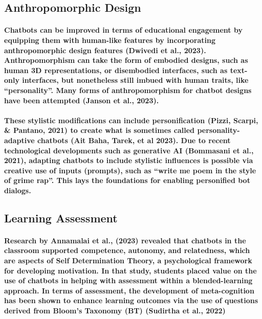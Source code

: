 \documentclass{article}
\begin{document}
\subsection*{Anthropomorphic Design}

\paragraph{Chatbots can be improved in terms of educational engagement by equipping them with human-like features by incorporating anthropomorphic design features (Dwivedi et al., 2023). Anthropomorphism can take the form of embodied designs, such as human 3D representations, or disembodied interfaces, such as text-only interfaces, but nonetheless still imbued with human traits, like “personality”. Many forms of anthropomorphism for chatbot designs have been attempted (Janson et al., 2023).}

\paragraph{These stylistic modifications can include personification (Pizzi, Scarpi, \& Pantano, 2021) to create what is sometimes called personality-adaptive chatbots (Ait Baha, Tarek, et al 2023). Due to recent technological developments such as generative AI (Bommasani et al., 2021), adapting chatbots to include stylistic influences is possible via creative use of inputs (prompts), such as “write me poem in the style of grime rap”. This lays the foundations for enabling personified bot dialogs.}

\subsection*{Learning Assessment}

\paragraph{Research by Annamalai et al., (2023) revealed that chatbots in the classroom supported competence, autonomy, and relatedness, which are aspects of Self Determination Theory, a psychological framework for developing motivation. In that study, students placed value on the use of chatbots in helping with assessment within a blended-learning approach. In terms of assessment, the development of meta-cognition has been shown to enhance learning outcomes via the use of questions derived from Bloom’s Taxonomy (BT) (Sudirtha et al., 2022)}
\end{document}
